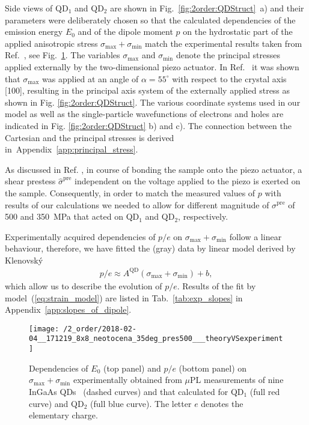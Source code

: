 Side views of QD$_1$ and QD$_2$ are shown in Fig.~\ref{fig:2order:QDStruct}~a) and their parameters were deliberately chosen so that the calculated dependencies of the emission energy $E_0$ and of the dipole moment $p$ on the hydrostatic part of the applied anisotropic stress $\sigma_{\mathrm{max}}+\sigma_{\mathrm{min}}$ match the experimental results taken from Ref.~\cite{Aberl:17}, see Fig.~\ref{fig:TheorVsExp}. The variables $\sigma_{\mathrm{max}}$ and $\sigma_{\mathrm{min}}$ denote the principal stresses~\cite{Trotta:15} applied externally by the two-dimensional piezo actuator. In  Ref.~\citep{Aberl:17} it was shown that $\sigma_{\mathrm{max}}$ was applied at an angle of $\alpha=55^{\circ}$ with respect to the crystal axis [100], resulting in the principal axis system of the externally applied stress as shown in Fig. \ref{fig:2order:QDStruct}. The various coordinate systems used in our model as well as the single-particle wavefunctions of electrons and holes are indicated in Fig. \ref{fig:2order:QDStruct} b) and c). The connection between the Cartesian and the principal stresses is derived in~Appendix~\ref{app:principal_stress}.

As discussed in Ref. \cite{Aberl:17}, in course of bonding the sample onto the piezo actuator, a shear prestess $\hat\sigma^\text{pre}$ independent on the voltage applied to the piezo is exerted on the sample. Consequently, in order to match the measured values of $p$ with results of our calculations we needed to allow for different magnitude of $\sigma^\text{pre}$ of 500 and 350~MPa that acted on QD$_1$ and QD$_2$, respectively.

Experimentally acquired dependencies of $p/e$ on $\sigma_{\mathrm{max}}+\sigma_{\mathrm{min}}$ follow a linear behaviour, therefore, we have fitted the (gray) data by linear model derived by Klenovský~\cite{Klenovsky_2018_InGaAs_straintuned}
\begin{eqnarray}
p/e\approx A^{\mathrm{QD}}\left(\sigma_\mathrm{max}+\sigma_\mathrm{min}\right)+b, \label{eq:strain_model}
\end{eqnarray}
which allow us to describe the evolution of $p/e$. Results of the fit by model~(\ref{eq:strain_model}) are listed in Tab.~\ref{tab:exp_slopes} in Appendix~\ref{app:slopes_of_dipole}.

%


\begin{figure}[!ht]
	\centering
	\renewcommand{\tabcolsep}{2pt}
	\texttt{[image: /2\_order/2018-02-04\_\_171219\_8x8\_neotocena\_35deg\_pres500\_\_\_theoryVSexperiment]} 
	\caption{
		Dependencies of $E_0$ (top panel) and $p/e$ (bottom panel) on $\sigma_{\mathrm{max}}+\sigma_{\mathrm{min}}$ experimentally obtained from $\mu$PL measurements of nine InGaAs QDs~\cite{Aberl:17} (dashed curves) and that calculated for QD$_1$ (full red curve) and QD$_2$ (full blue curve). The letter $e$ denotes the elementary charge.}
	\label{fig:TheorVsExp}
\end{figure}

